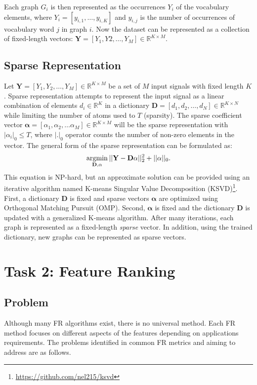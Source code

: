Each graph $G_i$ is then represented as the occurrences $Y_i$ of the vocabulary elements, where $Y_i = [y_{i,1}, \dots , y_{i,K}]$ and $y_{i,j}$ is the number of occurrences of vocabulary word $j$ in graph $i$. Now the dataset can be represented as a collection of fixed-length vectors: $\mathbf{Y} = [Y_1, Y2, \dots , Y_M] \in \mathbb{R}^{K \times M}$.


\subsection{Sparse Representation}

Let $\mathbf{Y} = [Y_1, Y_2, \dots, Y_M] \in \mathbb{R}^{K \times M}$ be a set of $M$ input signals with fixed length $K$. Sparse representation attempts to represent the input signal as a linear combination of elements $d_i \in \mathbb{R}^{K}$ in a dictionary $\mathbf{D} = [d_1, d_2, \dots , d_N] \in \mathbb{R}^{K \times N}$ while limiting the number of atoms used to $T$ (sparsity). The sparse coefficient vector $\mathbf{\alpha} = [\alpha_1, \alpha_2, \dots \alpha_M] \in \mathbb{R}^{K \times M}$ will be the sparse representation with $|\alpha_i|_0 \leq T$, where $|.|_0$ operator counts the number of non-zero elements in the vector. The general form of the sparse representation can be formulated as:
\begin{align}
\label{eqn: SR}
    \operatorname*{argmin}_{\mathbf{D}, \mathbf{\alpha}} || \mathbf{Y} - \mathbf{D\alpha}||_2^2 + ||\mathbf{\alpha}||_0.
\end{align}
This equation is NP-hard, but an approximate solution can be provided using an iterative algorithm named K-means Singular Value Decomposition (KSVD)\cite{Aharon2006}\footnote{\url{https://github.com/nel215/ksvd}}. First, a dictionary $\mathbf{D}$ is fixed and sparse vectors $\mathbf{\alpha}$ are optimized using Orthogonal Matching Pursuit (OMP)\cite{Pati1993}. Second, $\mathbf{\alpha}$ is fixed and the dictionary $\mathbf{D}$ is updated with a generalized K-means algorithm. After many iterations, each graph is represented as a fixed-length \emph{sparse} vector. In addition, using the trained dictionary, new graphs can be represented as sparse vectors.


\section{Task 2: Feature Ranking}

\subsection{Problem}
Although many FR algorithms exist, there is no universal method. Each FR method focuses on different aspects of the features depending on applications requirements. The problems identified in common FR metrics and aiming to address are as follows.


